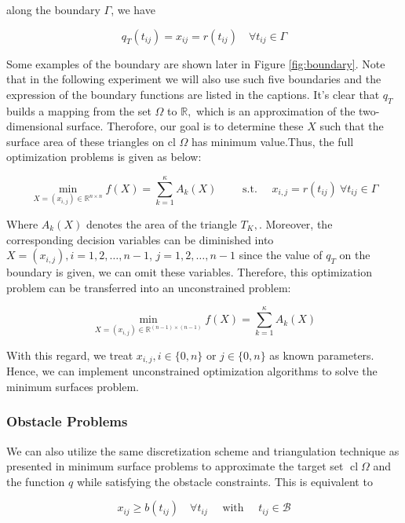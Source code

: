 along the boundary $\Gamma$, we have 

\begin{equation}
q_{T}\left(t_{i j}\right)=x_{i j}=r\left(t_{i j}\right) \quad \forall t_{i j} \in \Gamma
\end{equation}

Some examples of the boundary are shown later in Figure \ref{fig:boundary}. Note that in the following experiment we will also use such five boundaries and the expression of the boundary functions are listed in the captions. It's clear that $q_{T}$ builds a mapping from the set $\Omega$ to $\mathbb{R},$ which is an approximation of the two-dimensional surface.
Therofore, our goal is to determine these $X$ such that the surface area of these triangles on cl $\Omega$ has minimum value.Thus, the full optimization problems is given as below:

\begin{equation}
\min _{X=\left(x_{i, j}\right) \in \mathbb{R}^{n \times n}} f(X)=\sum_{k=1}^{\kappa} A_{k}(X) \qquad \text { s.t. } \quad x_{i, j}=r\left(t_{i j}\right) \ \forall t_{i j} \in \Gamma
\end{equation}

Where $A_{k}(X)$ denotes the area of the triangle $T_{K},$. Moreover, the corresponding decision variables can be diminished into $X=\left(x_{i, j}\right), i=1,2, \ldots, n-1$, $j=1,2, \ldots, n-1$
since the value of $q_{T}$ on the boundary is given, we can omit these variables. Therefore, this optimization problem can be transferred into an unconstrained problem:

\begin{equation}
\min _{X=\left(x_{i, j}\right) \in \mathbb{R}^{(n-1) \times(n-1)}} f(X)=\sum_{k=1}^{\kappa} A_{k}(X)
\end{equation}

With this regard, we treat $x_{i, j}, i \in\{0, n\}$ or $j \in\{0, n\}$ as known parameters. Hence, we can implement unconstrained optimization algorithms to solve the minimum surfaces problem.
\subsubsection{Obstacle Problems}
We can also utilize the same discretization scheme and triangulation technique as presented in minimum surface problems to approximate the target set $\operatorname{cl} \Omega$ and the function $q$ while satisfying the obstacle constraints. This is equivalent to 

\begin{equation}
x_{i j} \geq b\left(t_{i j}\right) \quad \forall t_{i j} \quad \text { with } \quad t_{i j} \in \mathcal{B}
\end{equation}

